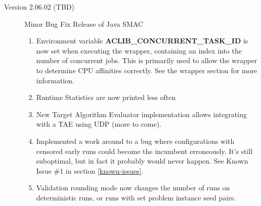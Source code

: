 \documentclass[11pt,letterpaper,oneside]{article}
\begin{document}
\begin{description}
          \item[Version 2.06.02 (TBD)] Minor Bug Fix Release of Java SMAC
          	\begin{enumerate}
          		\item Environment variable \textbf{ACLIB\_CONCURRENT\_TASK\_ID} is now set when executing the wrapper, containing an index into the number of concurrent jobs. This is primarily used to allow the wrapper to determine CPU affinities correctly. See the wrapper section for more information.
          		\item Runtime Statistics are now printed less often
          		\item New Target Algorithm Evaluator implementation allows integrating with a TAE using UDP (more to come).
          		\item Implemented a work around to a bug where configurations with censored early runs could become the incumbent erroneously. It's still suboptimal, but in fact it probably would never happen. See Known Issue \#1 in section \ref{known-issues}.
          		\item Validation rounding mode now changes the number of runs on deterministic runs, or runs with set problem instance seed pairs.
          	\end{enumerate}
          	

	\end{description}
\end{document}
